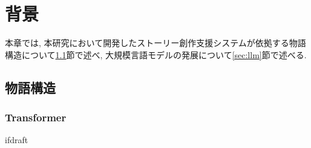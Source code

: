 \documentclass[a4j,12pt]{jsreport}
\begin{document}
\pagestyle{fancy}
\lhead{\rightmark}
\renewcommand{\chaptermark}[1]{\markboth{第\ \thechapter\ 章\ #1}{}}
\fi

\chapter{背景}\label{chap:background}%
本章では, 本研究において開発したストーリー創作支援システムが依拠する物語構造について\ref{sec:story_structure}節で述べ, 大規模言語モデルの発展について\ref{sec:llm}節で述べる.

\section{物語構造}\label{sec:story_structure}

\subsection{Transformer}

\expandafter\ifx\csname ifdraft\endcsname\relax
   \fancyhead[LO]{}
   \printbibliography[title=参考文献]
   
\end{document}
